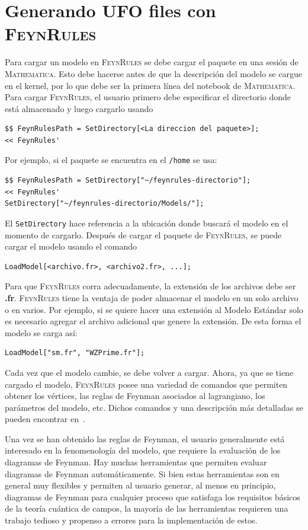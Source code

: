 \chapter{Generando UFO files con \textsc{FeynRules}}\label{GenUFO}

Para cargar un modelo en \textsc{FeynRules} se debe cargar el paquete en una sesión de \textsc{Mathematica}. Esto debe hacerse antes de que la descripción del modelo se cargue en el kernel, por lo que debe ser la primera línea del notebook de \textsc{Mathematica}. Para cargar \textsc{FeynRules}, el usuario primero debe especificar el directorio donde está almacenado y luego cargarlo usando 
%
\begin{verbatim}
$$ FeynRulesPath = SetDirectory[<La direccion del paquete>];
<< FeynRules'
\end{verbatim}
%
Por ejemplo, si el paquete se encuentra en el \verb|/home| se usa:
%
\begin{verbatim}
$$ FeynRulesPath = SetDirectory["~/feynrules-directorio"];
<< FeynRules'
SetDirectory["~/feynrules-directorio/Models/"];
\end{verbatim}
%
El \verb|SetDirectory| hace referencia a la ubicación donde buscará el modelo en el momento de cargarlo. Después de cargar el paquete de \textsc{FeynRules}, se puede cargar el modelo usando el comando 
%
\begin{verbatim}
LoadModel[<archivo.fr>, <archivo2.fr>, ...];
\end{verbatim}
%
Para que \textsc{FeynRules} corra adecuadamente, la extensión de los archivos debe ser \textbf{.fr}. \textsc{FeynRules} tiene la ventaja de poder almacenar el modelo en un solo archivo o en varios. Por ejemplo, si se quiere hacer una extensión al Modelo Estándar solo es necesario agregar el archivo adicional que genere la extensión. De esta forma el modelo se carga así:
%
\begin{verbatim}
LoadModel["sm.fr", "WZPrime.fr"];
\end{verbatim}
%
Cada vez que el modelo cambie, se debe volver a cargar.
Ahora, ya que se tiene cargado el modelo, \textsc{FeynRules} posee una variedad de comandos que permiten obtener los vértices, las reglas de Feynman asociados al lagrangiano, los parámetros del modelo, etc.  Dichos comandos y una descripción más detalladas se pueden encontrar en~\cite{Alloul:2013bka}. 

Una vez se han obtenido las reglas de Feynman, el usuario generalmente está interesado en la fenomenología del modelo, que requiere la evaluación de los diagramas de Feynman. Hay muchas herramientas que permiten evaluar diagramas de Feynman automáticamente. Si bien estas herramientas son en general muy flexibles y permiten al usuario generar, al menos en principio, diagramas de Feynman para cualquier proceso que satisfaga los requisitos básicos de la teoría cuántica de campos, la mayoría de las herramientas requieren una trabajo tedioso y propenso a errores para la implementación de estos.

